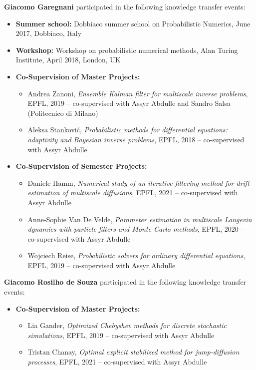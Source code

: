 \documentclass[10pt]{article}
\begin{document}
\textbf{Giacomo Garegnani} participated in the following knowledge transfer events:
\begin{itemize}
	\item \textbf{Summer school:} Dobbiaco summer school on Probabilistic Numerics, June 2017, Dobbiaco, Italy
	\item \textbf{Workshop:} Workshop on probabilistic numerical methods, Alan Turing Institute, April 2018, London, UK
	\item \textbf{Co-Supervision of Master Projects:} 
	\begin{itemize}
		\item Andrea Zanoni, \textit{Ensemble Kalman filter for multiscale inverse problems}, EPFL, 2019 -- co-supervised with Assyr Abdulle and Sandro Salsa (Politecnico di Milano)
		\item Aleksa Stanković, \textit{Probabilistic methods for differential equations: adaptivity and Bayesian inverse problems}, EPFL, 2018 -- co-supervised with Assyr Abdulle
	\end{itemize}
	\item \textbf{Co-Supervision of Semester Projects:}
	\begin{itemize}
		\item Daniele Hamm, \textit{Numerical study of an iterative filtering method for drift estimation of multiscale diffusions}, EPFL, 2021 -- co-supervised with Assyr Abdulle
		\item Anne-Sophie Van De Velde, \textit{Parameter estimation in multiscale Langevin dynamics with particle filters and Monte Carlo methods}, EPFL, 2020 -- co-supervised with Assyr Abdulle
		\item Wojciech Reise, \textit{Probabilistic solvers for ordinary differential equations}, EPFL, 2019 -- co-supervised with Assyr Abdulle
	\end{itemize}
\end{itemize}
%
\textbf{Giacomo Rosilho de Souza} participated in the following knowledge transfer events:
\begin{itemize}
	\item \textbf{Co-Supervision of Master Projects:}
	\begin{itemize}
		\item Lia Gander, \textit{Optimized Chebyshev methods for discrete stochastic simulations}, EPFL, 2019 -- co-supervised with Assyr Abdulle
		\item Tristan Chanay, \textit{Optimal explicit stabilized method for jump-diffusion processes}, EPFL, 2021 -- co-supervised with Assyr Abdulle
	\end{itemize} 
\end{itemize}
\end{document}
